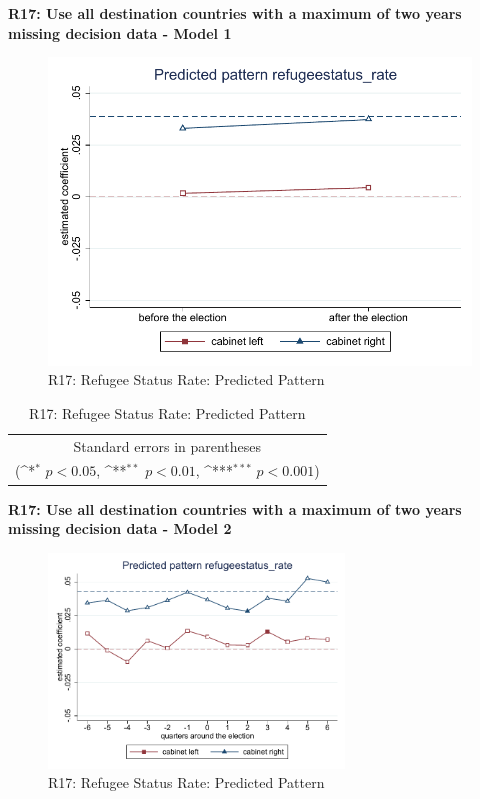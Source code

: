 \documentclass[10pt,a4paper]{scrartcl}
\begin{document}
\clearpage
\textbf{R17: Use all destination countries with a maximum of two years missing decision data - Model 1}
\begin{figure}[!ht]
	\centering
	\includegraphics[width=1\textwidth]{figures_edited/refugeestatus_rate_graph1_R17.pdf}
	\caption{R17: Refugee Status Rate: Predicted Pattern}
\end{figure}

\begin{table}[!ht]\centering
	\renewcommand{\arraystretch}{1.25}
	\def\sym#1{\ifmmode^{#1}\else\(^{#1}\)\fi}
	\caption{R17: Refugee Status Rate: Predicted Pattern}
	\begin{tabular}{l*{2}{c}}
		\hline\hline
		
		\hline\hline
		\multicolumn{3}{c}{\footnotesize Standard errors in parentheses} \\
		\multicolumn{3}{c}{\footnotesize (\sym{*} \(p<0.05\), \sym{**} \(p<0.01\), \sym{***} \(p<0.001\))}\\
	\end{tabular}
\end{table}

\clearpage
\textbf{R17: Use all destination countries with a maximum of two years missing decision data - Model 2}
\begin{figure}[!ht]
	\centering
	\includegraphics[width=0.7\textwidth]{figures_edited/refugeestatus_rate_graph2_R17.pdf}
	\caption{R17: Refugee Status Rate: Predicted Pattern}
\end{figure}
\end{document}
